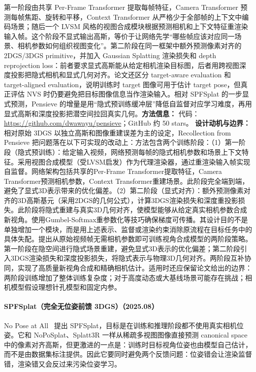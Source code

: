 第一阶段由共享 Per-Frame Transformer 提取每帧特征，Camera Transformer 预测每帧焦距、旋转和平移，Context Transformer 从严格少于全部帧的上下文中编码场景；随后一个 LVSM 风格的视图合成模块根据预测相机和上下文特征重渲染输入帧。这个阶段不显式输出高斯，等价于让网络先学“哪些帧应该对应同一场景、相机参数如何组织视图变化”。第二阶段在同一框架中额外预测像素对齐的 2DGS/3DGS primitive，并加入 Gaussian Splatting 渲染损失和 depth reprojection loss：前者要求显式高斯能从给定相机渲染目标图，后者用跨视图深度投影把隐式相机和显式几何对齐。论文还区分 target-aware evaluation 和 target-aligned evaluation，说明训练时 target 图像可用于估计 target pose，但真正评估 NVS 时仍要避免把目标图像信息当作渲染输入。相对 SPFSplat 的一步显式预测，Pensieve 的增量是用“隐式预训练缓冲层”降低自监督对应学习难度，再用显式高斯和深度投影把潜空间拉回真实几何。\textbf{方法信息：} 代码：\url{https://github.com/dwawayu/pensieve}；GitHub 约 50 stars。
\textbf{设计动机与边界：} 相对原始 3DGS 以独立高斯和图像重建误差为主的设定，Recollection from Pensieve 把问题落在以下可实现的改动上：方法包含两个训练阶段：（1）第一阶段（隐式预训练）：给定输入视频，网络预测每帧的隐式相机参数和场景上下文特征。采用视图合成模型（受LVSM启发）作为代理渲染器，通过重渲染输入帧实现自监督。网络架构包括共享的Per-Frame Transformer提取特征，Camera Transformer预测相机参数，Context Transformer重建场景。此阶段完全端到端，避免了显式3D表示带来的优化偏差。（2）第二阶段（显式对齐）：额外预测像素对齐的3D高斯基元（采用2DGS的几何公式），计算3DGS渲染损失和深度重投影损失。此阶段将隐式重建与真实3D几何对齐，使模型能够从给定真实相机参数合成新视角。使用Gumbel-Softmax重参数化等技巧确保梯度可传播。其设计目的不是单独增加一个模块，而是用上述表示、监督或渲染约束消除原流程在目标任务中的具体失配。提出从原始视频帧无需相机参数即可训练视角合成模型的两阶段策略。第一阶段在隐空间进行隐式场景重建，避免显式3D表示的优化偏差；第二阶段引入3DGS渲染损失和深度投影损失，将隐式表示与物理3D几何对齐。两阶段互补协同，实现了高质量新视角合成和精确相机估计。适用时还应保留论文给出的边界：两阶段训练增加了整体训练复杂度；对于高度动态或大基线场景可能存在挑战；相机模型假设理想针孔模型和固定内参。
\paragraph{SPFSplat（完全无位姿前馈 3DGS）（2025.08）}
No Pose at All~\cite{2508_01171} 提出 SPFSplat，目标是在训练和推理阶段都不使用真实相机位姿。它和 NoPoSplat、Splatt3R 一样从稀疏多视图图像直接预测 canonical space 中的像素对齐高斯，但更激进的一点是：训练时目标视角位姿也由模型自己估计，而不是由数据集标注提供。因此它要同时避免两个反馈问题：位姿错会让渲染监督错，渲染错又会反过来污染位姿学习。

